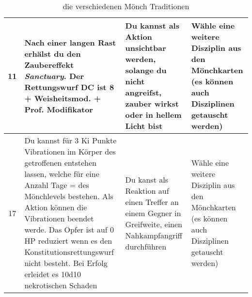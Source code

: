 \begin{table}
\begin{tabular}{cp{6cm}p{6cm}p{6cm}}
	11 &
	Nach einer langen Rast erhälst du den Zaubereffekt \textit{Sanctuary}. Der Rettungswurf DC ist 8 + Weisheitsmod. + Prof. Modifikator &
	Du kannst als Aktion unsichtbar werden, solange du nicht angreifst, zauber wirkst oder in hellem Licht bist &
	Wähle eine weitere Disziplin aus den Mönchkarten (es können auch Disziplinen getauscht werden)\\ \hline
	
	17 &
	Du kannst für 3 Ki Punkte Vibrationen im Körper des getroffenen entstehen lassen, welche für eine Anzahl Tage = des Mönchlevels bestehen.\linebreak
	Als Aktion können die Vibrationen beendet werde. Das Opfer ist auf 0 HP reduziert wenn es den Konstitutionsrettungswurf nicht besteht. Bei Erfolg erleidet es 10d10 nekrotischen Schaden&
	Du kanst als Reaktion auf einen Treffer an einem Gegner in Greifweite, einen Nahkampfangriff durchführen&
	Wähle eine weitere Disziplin aus den Mönchkarten (es können auch Disziplinen getauscht werden)\\ \hline
	
	\end{tabular}
	\caption{die verschiedenen Mönch Traditionen}
\end{table}
